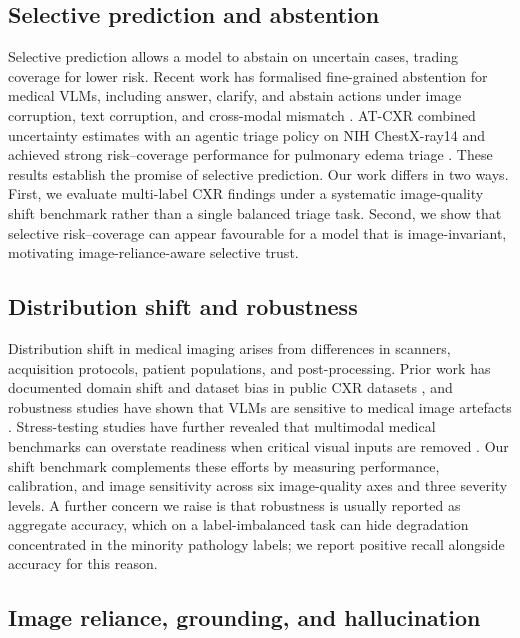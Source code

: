 \subsection{Selective prediction and abstention}

Selective prediction allows a model to abstain on uncertain cases, trading coverage for lower risk. Recent work has formalised fine-grained abstention for medical VLMs, including answer, clarify, and abstain actions under image corruption, text corruption, and cross-modal mismatch \citep{nguyen2026answer}. AT-CXR combined uncertainty estimates with an agentic triage policy on NIH ChestX-ray14 and achieved strong risk--coverage performance for pulmonary edema triage \citep{li2025atcxr}. These results establish the promise of selective prediction. Our work differs in two ways. First, we evaluate multi-label CXR findings under a systematic image-quality shift benchmark rather than a single balanced triage task. Second, we show that selective risk--coverage can appear favourable for a model that is image-invariant, motivating image-reliance-aware selective trust.

\subsection{Distribution shift and robustness}

Distribution shift in medical imaging arises from differences in scanners, acquisition protocols, patient populations, and post-processing. Prior work has documented domain shift and dataset bias in public CXR datasets \citep{rafferty2026limitations}, and robustness studies have shown that VLMs are sensitive to medical image artefacts \citep{cheng2025robustness}. Stress-testing studies have further revealed that multimodal medical benchmarks can overstate readiness when critical visual inputs are removed \citep{gu2025illusion}. Our shift benchmark complements these efforts by measuring performance, calibration, and image sensitivity across six image-quality axes and three severity levels. A further concern we raise is that robustness is usually reported as aggregate accuracy, which on a label-imbalanced task can hide degradation concentrated in the minority pathology labels; we report positive recall alongside accuracy for this reason.

\subsection{Image reliance, grounding, and hallucination}

